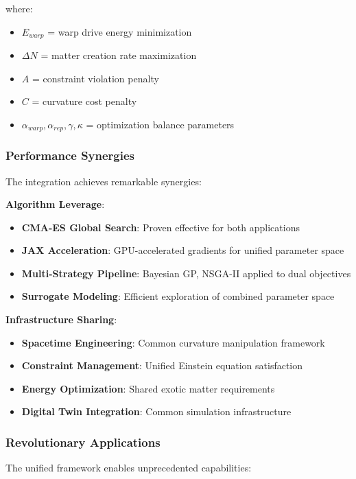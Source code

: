 \documentclass[11pt]{article}
\begin{document}
where:
\begin{itemize}
\item $E_{warp}$ = warp drive energy minimization
\item $\Delta N$ = matter creation rate maximization
\item $A$ = constraint violation penalty
\item $C$ = curvature cost penalty
\item $\alpha_{warp}, \alpha_{rep}, \gamma, \kappa$ = optimization balance parameters
\end{itemize}

\subsubsection{Performance Synergies}

The integration achieves remarkable synergies:

\textbf{Algorithm Leverage}:
\begin{itemize}
\item \textbf{CMA-ES Global Search}: Proven effective for both applications
\item \textbf{JAX Acceleration}: GPU-accelerated gradients for unified parameter space
\item \textbf{Multi-Strategy Pipeline}: Bayesian GP, NSGA-II applied to dual objectives
\item \textbf{Surrogate Modeling}: Efficient exploration of combined parameter space
\end{itemize}

\textbf{Infrastructure Sharing}:
\begin{itemize}
\item \textbf{Spacetime Engineering}: Common curvature manipulation framework
\item \textbf{Constraint Management}: Unified Einstein equation satisfaction
\item \textbf{Energy Optimization}: Shared exotic matter requirements
\item \textbf{Digital Twin Integration}: Common simulation infrastructure
\end{itemize}

\subsubsection{Revolutionary Applications}

The unified framework enables unprecedented capabilities:
\end{document}
